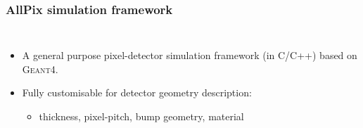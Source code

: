 \begin{frame}
  \frametitle{AllPix simulation framework}

  \begin{columns}

    \begin{itemize}
    \item A general purpose pixel-detector simulation framework (in
      C/C++) based on \textsc{Geant4}.
    \item Fully customisable for detector geometry description:
      \begin{itemize}
      \item thickness, pixel-pitch, bump geometry, material
      \end{itemize}
    \end{itemize}
    
    \centering
  \end{columns}


\end{frame}
